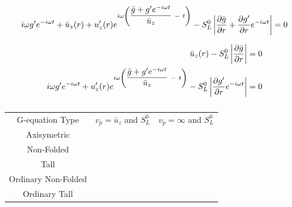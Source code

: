 \begin{theorem}
\begin{align}
	i \omega g' e^{-i\omega t} +   \bar{u}_z(r) + u'_z(r)e^{i\omega\left(\dfrac{\bar{g}+ g'e^{-i \omega t}}{\bar{u}_z}\ -\ t\right)}- S_L^0\modu{  \dfrac{\partial \bar{g}}{\partial r} + \dfrac{\partial g'}{\partial r} e^{-i \omega t}}=0 
\end{align}

\begin{align}
	\bar{u}_z(r) - S_L^0\left| \dfrac{\partial \bar{g}}{\partial r}\right|& =0 \\
i \omega g' e^{-i\omega t} + u'_z(r)e^{i\omega\left(\dfrac{\bar{g}+ g'e^{-i \omega t}}{\bar{u}_z}\ -\ t\right)}  - S_L^0 \left| \dfrac{\partial g'}{\partial r} e^{-i \omega t}\right|&=0
\end{align}
\end{theorem}


\begin{table}[!h]
\begin{center}
\begin{tabular}{c c c} \cmidrule[1pt]{1-3}
G-equation Type& $v_p=\bar{u}_z$ and $S_L^0$ & $v_p=\infty$ and $S_L^0$\\ \cmidrule{1-3}
Axisymetric & &\\
Non-Folded & &\\
Tall & &\\
Ordinary Non-Folded& &\\
Ordinary Tall & &\\ 
\bottomrule[1pt]
\end{tabular}
\end{center}
\caption{}
\label{}
\end{table}

